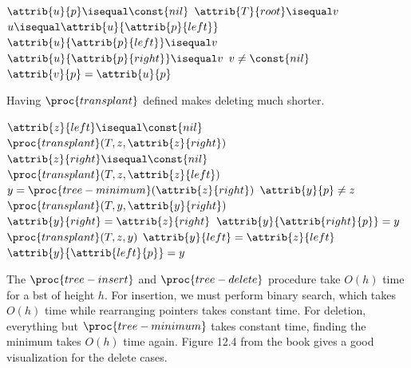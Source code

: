 \documentclass{article}
\begin{document}
\begin{codebox}
\li \If $\attrib{u}{p} \isequal \const{nil}$
\li \Then
        $\attrib{T}{root} \isequal v$
\li \ElseIf $u \isequal \attrib{u}{\attrib{p}{left}}$
\li \Then
        $\attrib{u}{\attrib{p}{left}} \isequal v$
\li \Else
\li     $\attrib{u}{\attrib{p}{right}} \isequal v$
    \End
\li \If $v \neq \const{nil}$
\li \Then
        $\attrib{v}{p} = \attrib{u}{p}$
    \End
\end{codebox}

Having $\proc{transplant}$ defined makes deleting much shorter.
\begin{codebox}
\li \If $\attrib{z}{left} \isequal \const{nil}$
\li \Then
        $\proc{transplant}(T, z, \attrib{z}{right})$
\li \ElseIf $\attrib{z}{right} \isequal \const{nil}$
\li \Then
        $\proc{transplant}(T, z, \attrib{z}{left})$
\li \Else
\li     $y = \proc{tree-minimum}(\attrib{z}{right})$
\li     \If $\attrib{y}{p} \neq z$
\li     \Then
            $\proc{transplant}(T, y, \attrib{y}{right})$
\li         $\attrib{y}{right} = \attrib{z}{right}$
\li         $\attrib{y}{\attrib{right}{p}} = y$
        \End
\li     $\proc{transplant}(T, z, y)$
\li     $\attrib{y}{left} = \attrib{z}{left}$
\li     $\attrib{y}{\attrib{left}{p}} = y$
    \End
\end{codebox}

The $\proc{tree-insert}$ and $\proc{tree-delete}$ procedure take $O(h)$ time for a bst of height $h$. For insertion, we must perform binary search, which takes $O(h)$ time while rearranging pointers takes constant time. For deletion, everything but $\proc{tree-minimum}$ takes constant time, finding the minimum takes $O(h)$ time again. Figure 12.4 from the book gives a good visualization for the delete cases.

\newpage
\end{document}
